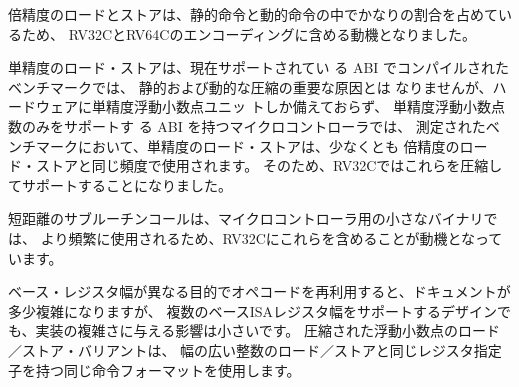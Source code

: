 \begin{commentary}
\begin{comment}
Double-precision loads and stores are a significant fraction of static
and dynamic instructions, hence the motivation to include them in the
RV32C and RV64C encoding.
\end{comment}

倍精度のロードとストアは、静的命令と動的命令の中でかなりの割合を占めているため、
RV32CとRV64Cのエンコーディングに含める動機となりました。

\begin{comment}
Although single-precision loads and stores are not a significant
source of static or dynamic compression for benchmarks compiled for
the currently supported ABIs, for microcontrollers that only provide
hardware single-precision floating-point units and have an ABI that
only supports single-precision floating-point numbers, the
single-precision loads and stores will be used at least as frequently
as double-precision loads and stores in the measured benchmarks.
Hence, the motivation to provide compressed support for these in
RV32C.
\end{comment}

単精度のロード・ストアは、現在サポートされてい る ABI でコンパイルされたベンチマークでは、
静的および動的な圧縮の重要な原因とは なりませんが、ハードウェアに単精度浮動小数点ユニッ トしか備えておらず、
単精度浮動小数点数のみをサポートす る ABI を持つマイクロコントローラでは、
測定されたベ ンチマークにおいて、単精度のロード・ストアは、少なくとも 倍精度のロード・ストアと同じ頻度で使用されます。
そのため、RV32Cではこれらを圧縮してサポートすることになりました。

\begin{comment}
Short-range subroutine calls are more likely in small binaries for
microcontrollers, hence the motivation to include these in RV32C.
\end{comment}

短距離のサブルーチンコールは、マイクロコントローラ用の小さなバイナリでは、
より頻繁に使用されるため、RV32Cにこれらを含めることが動機となっています。

\begin{comment}
Although reusing opcodes for different purposes for different base
register widths adds some complexity to documentation, the impact on
implementation complexity is small even for designs that support
multiple base ISA register widths.  The compressed floating-point load
and store variants use the same instruction format with the same
register specifiers as the wider integer loads and stores.
\end{comment}

ベース・レジスタ幅が異なる目的でオペコードを再利用すると、ドキュメントが多少複雑になりますが、
複数のベースISAレジスタ幅をサポートするデザインでも、実装の複雑さに与える影響は小さいです。
圧縮された浮動小数点のロード／ストア・バリアントは、
幅の広い整数のロード／ストアと同じレジスタ指定子を持つ同じ命令フォーマットを使用します。
\end{commentary}

